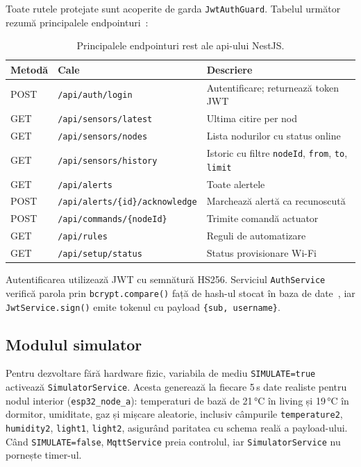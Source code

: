 Toate rutele protejate sunt acoperite de garda \texttt{JwtAuthGuard}.
Tabelul următor rezumă principalele endpointuri~\cite{jones2015jwt}:

\begin{table}[H]
  \centering
  \caption{Principalele endpointuri \gls{rest} ale \gls{api}-ului NestJS.}
  \label{tab:rest-endpoints}
  \begin{tabular}{@{} l l p{5.5cm} @{}}
    \toprule
    \textbf{Metodă} & \textbf{Cale} & \textbf{Descriere} \\
    \midrule
    POST & \texttt{/api/auth/login}             & Autentificare; returnează token JWT \\
    GET  & \texttt{/api/sensors/latest}         & Ultima citire per nod \\
    GET  & \texttt{/api/sensors/nodes}          & Lista nodurilor cu status online \\
    GET  & \texttt{/api/sensors/history}        & Istoric cu filtre \texttt{nodeId}, \texttt{from}, \texttt{to}, \texttt{limit} \\
    GET  & \texttt{/api/alerts}                 & Toate alertele \\
    POST & \texttt{/api/alerts/\{id\}/acknowledge} & Marchează alertă ca recunoscută \\
    POST & \texttt{/api/commands/\{nodeId\}}    & Trimite comandă actuator \\
    GET  & \texttt{/api/rules}                  & Reguli de automatizare \\
    GET  & \texttt{/api/setup/status}           & Status provisionare Wi-Fi \\
    \bottomrule
  \end{tabular}
\end{table}

Autentificarea utilizează JWT cu semnătură HS256.
Serviciul \texttt{AuthService} verifică parola prin \texttt{bcrypt.compare()}
față de hash-ul stocat în baza de date~\cite{provos2003bcrypt},
iar \texttt{JwtService.sign()} emite tokenul cu payload
\texttt{\{sub, username\}}.

\subsection{Modulul simulator}
\label{sec:simulator}

Pentru dezvoltare fără hardware fizic, variabila de mediu
\texttt{SIMULATE=true} activează \texttt{SimulatorService}.
Acesta generează la fiecare 5\,s date realiste pentru nodul interior
(\texttt{esp32\_node\_a}): temperaturi de bază de 21\,°C în living și
19\,°C în dormitor, umiditate, gaz și mișcare aleatorie, inclusiv
câmpurile \texttt{temperature2}, \texttt{humidity2}, \texttt{light1},
\texttt{light2}, asigurând paritatea cu schema reală a payload-ului.
Când \texttt{SIMULATE=false}, \texttt{MqttService} preia controlul,
iar \texttt{SimulatorService} nu pornește timer-ul.

